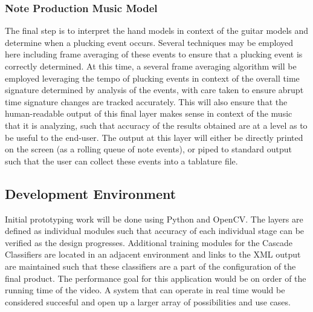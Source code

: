 \subsubsection{Note Production Music Model}
The final step is to interpret the hand models in context of the guitar models and determine when a plucking event occurs.
Several techniques may be employed here including frame averaging of these events to ensure that a plucking event
is correctly determined.
At this time, a several frame averaging algorithm will be employed leveraging the tempo of plucking events in context of 
the overall time signature determined by analysis of the events, with care taken to ensure abrupt time signature changes
are tracked accurately.
This will also ensure that the human-readable output of this final layer makes sense in context of the music that it is
analyzing, such that accuracy of the results obtained are at a level as to be useful to the end-user.
The output at this layer will either be directly printed on the screen (as a rolling queue of note events),
or piped to standard output such that the user can collect these events into a tablature file.

\subsection{Development Environment}
Initial prototyping work will be done using Python and OpenCV.
The layers are defined as individual modules such that accuracy of each individual stage can be verified as the design progresses.
Additional training modules for the Cascade Classifiers are located in an adjacent environment
and links to the XML output are maintained such that these classifiers are a part of the configuration of the final product.
The performance goal for this application would be on order of the running time of the video.
A system that can operate in real time would be considered succesful and open up a larger array of possibilities and use cases.

